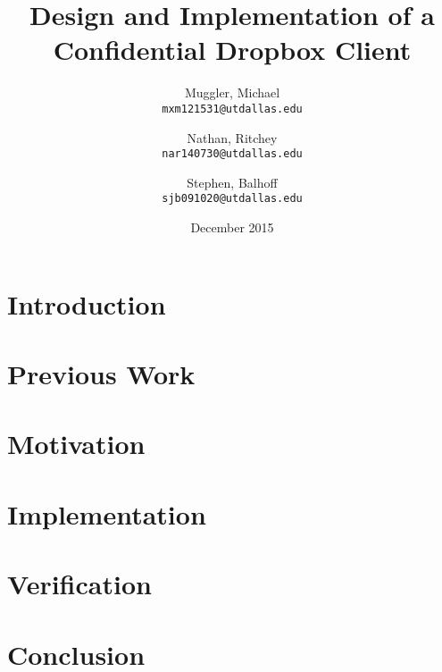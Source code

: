 \documentclass[11pt]{article}
\title{Design and Implementation of a Confidential Dropbox Client}
\author{
  Muggler, Michael\\
  \texttt{mxm121531@utdallas.edu}
  \and
  Nathan, Ritchey\\
  \texttt{nar140730@utdallas.edu} 
  \and
  Stephen, Balhoff\\
  \texttt{sjb091020@utdallas.edu}
}
\date{December 2015}
\begin{document}
\maketitle

\section{Introduction}

\section{Previous Work}

\section{Motivation}

\section{Implementation}

\section{Verification}

\section{Conclusion}
\end{document}
